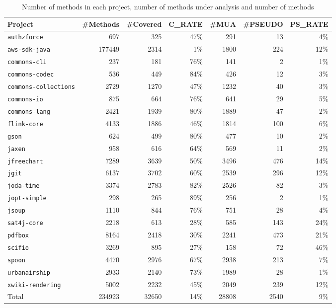 \begin{table}
	\caption{Number of methods in each project, number of methods under analysis and number of \pseudotested{} methods}
	\label{tab:testedclass}
	\def\arraystretch{1}%
	\setlength\tabcolsep{1.2pt} %
	\begin{tabular}{lrrrrrr}
			\toprule
			Project & {\#Methods} & {\#Covered} & C\_RATE & {\#MUA} & {\#PSEUDO}  & PS\_RATE  \\
			\midrule
			\texttt{authzforce}          &    697 &  325 & 47\% &  291 &   13 &  4\% \\  
			\texttt{aws-sdk-java}        & 177449 & 2314 &  1\% & 1800 &  224 & 12\% \\
			\texttt{commons-cli}         &    237 &  181 & 76\% &  141 &    2 &  1\% \\  
			\texttt{commons-codec}       &    536 &  449 & 84\% &  426 &   12 &  3\% \\  
			\texttt{commons-collections} &   2729 & 1270 & 47\% & 1232 &   40 &  3\% \\  
			\texttt{commons-io}          &    875 &  664 & 76\% &  641 &   29 &  5\% \\  
			\texttt{commons-lang}        &   2421 & 1939 & 80\% & 1889 &   47 &  2\% \\  
			\texttt{flink-core}          &   4133 & 1886 & 46\% & 1814 &  100 &  6\% \\  
			\texttt{gson}                &    624 &  499 & 80\% &  477 &   10 &  2\% \\    
			\texttt{jaxen}               &    958 &  616 & 64\% &  569 &   11 &  2\% \\  
			\texttt{jfreechart}          &   7289 & 3639 & 50\% & 3496 &  476 & 14\% \\  
			\texttt{jgit}                &   6137 & 3702 & 60\% & 2539 &  296 & 12\% \\  
			\texttt{joda-time}           &   3374 & 2783 & 82\% & 2526 &   82 &  3\% \\  
			\texttt{jopt-simple}         &    298 &  265 & 89\% &  256 &    2 &  1\% \\  
			\texttt{jsoup}               &   1110 &  844 & 76\% &  751 &   28 &  4\% \\  
			\texttt{sat4j-core}          &   2218 &  613 & 28\% &  585 &  143 & 24\% \\  
			\texttt{pdfbox}              &   8164 & 2418 & 30\% & 2241 &  473 & 21\% \\  
			\texttt{scifio}              &   3269 &  895 & 27\% &  158 &   72 & 46\% \\  
			\texttt{spoon}               &   4470 & 2976 & 67\% & 2938 &  213 &  7\% \\  
			\texttt{urbanairship}        &   2933 & 2140 & 73\% & 1989 &   28 &  1\% \\  
			\texttt{xwiki-rendering}     &   5002 & 2232 & 45\% & 2049 &  239 & 12\% \\
			\midrule
			Total               & 234923 & 32650 & 14\% & 28808 & 2540 & 9\% \\
			\bottomrule
	\end{tabular}
\end{table}

